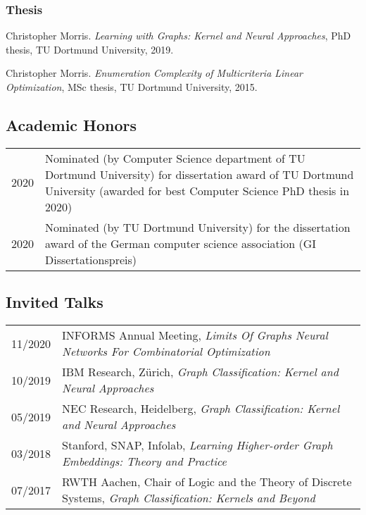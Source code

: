 \documentclass[11pt, a4paper]{scrartcl}
\begin{document}
\begin{thebibliography}{5}

\subsubsection*{Thesis}

Christopher Morris.
\emph{Learning with Graphs: Kernel and Neural Approaches}, PhD thesis, TU Dortmund University, 2019.

Christopher Morris.
\emph{Enumeration Complexity of Multicriteria Linear Optimization}, MSc thesis, TU Dortmund University, 2015.

	
\end{thebibliography}

\subsection*{Academic Honors}
\begin{tabular}{p{2.1cm}p{12.0cm}}
	2020& Nominated (by Computer Science department of TU Dortmund University) for dissertation award of TU Dortmund University (awarded for best Computer Science PhD thesis in 2020)\\
	2020& Nominated (by TU Dortmund University) for the dissertation award of the German computer science association (GI Dissertationspreis)\\
\end{tabular}

\subsection*{Invited Talks}
\begin{tabular}{p{2.1cm}p{12.0cm}}
11/2020&INFORMS Annual Meeting, \emph{Limits Of Graphs Neural Networks For Combinatorial Optimization} \\
10/2019&IBM Research, Zürich, \emph{Graph Classification: Kernel and Neural Approaches}\\
05/2019&NEC Research, Heidelberg, \emph{Graph Classification: Kernel and Neural Approaches}\\ 
03/2018&Stanford, SNAP, Infolab, \emph{Learning Higher-order Graph Embeddings: Theory and Practice}\\
07/2017&RWTH Aachen, Chair of Logic and the Theory of Discrete Systems, \emph{Graph Classification: Kernels and Beyond}\\

\end{tabular}
\end{document}
